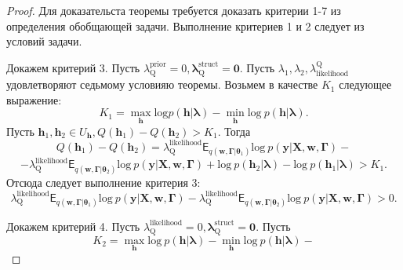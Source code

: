 \begin{proof}
Для доказательста теоремы требуется доказать критерии 1-7 из определения обобщающей задачи.
Выполнение критериев 1 и 2 следует из условий задачи.

Докажем критерий 3. 
Пусть $\lambda^{\text{prior}}_\text{Q} = 0, \boldsymbol{\lambda}^\text{struct}_\text{Q} = \mathbf{0}$. 
Пусть $\lambda_1, \lambda_2, \lambda_\text{likelihood}^\text{Q}$ удовлетворяют седьмому условияю теоремы.
Возьмем в качестве $K_1$ следующее выражение:
\[
    K_1= \max_{\mathbf{h}} \text{log} p (\mathbf{h}|\boldsymbol{\lambda})-\min_{\mathbf{h}} \text{log}~p(\mathbf{h}|\boldsymbol{\lambda}).
\]
Пусть $\mathbf{h}_1, \mathbf{h}_2 \in U_\mathbf{h}, Q(\mathbf{h}_1)-Q(\mathbf{h}_2)>K_1$.
Тогда 
\[
Q(\mathbf{h}_1)-Q(\mathbf{h}_2) = \lambda^\text{likelihood}_\text{Q} \mathsf{E}_{q(\mathbf{w}, \boldsymbol{\Gamma}|\boldsymbol{\theta}_1)} \text{log}~p(\mathbf{y}|\mathbf{X}, \mathbf{w}, \boldsymbol{\Gamma})-\]
\[
-\lambda^\text{likelihood}_\text{Q}  \mathsf{E}_{q(\mathbf{w}, \boldsymbol{\Gamma}|\boldsymbol{\theta}_2)} \text{log}~p(\mathbf{y}|\mathbf{X}, \mathbf{w}, \boldsymbol{\Gamma})
+\text{log}~p(\mathbf{h}_2|\boldsymbol{\lambda})-\text{log}~p(\mathbf{h}_1|\boldsymbol{\lambda})>K_1.
\]
Отсюда следует  выполнение критерия 3:
\[
\lambda^\text{likelihood}_\text{Q} \mathsf{E}_{q(\mathbf{w}, \boldsymbol{\Gamma}|\boldsymbol{\theta}_1)} \text{log}~p(\mathbf{y}|\mathbf{X}, \mathbf{w}, \boldsymbol{\Gamma}) - \lambda^\text{likelihood}_\text{Q} \mathsf{E}_{q(\mathbf{w}, \boldsymbol{\Gamma}|\boldsymbol{\theta}_2)} \text{log}~p(\mathbf{y}|\mathbf{X}, \mathbf{w}, \boldsymbol{\Gamma}) > 0.
\]

Докажем критерий 4. 
Пусть $\lambda^{\text{likelihood}}_\text{Q} = 0, \boldsymbol{\lambda}^\text{struct}_\text{Q} = \mathbf{0}$. 
Пусть 
\[
K_2 =  \max_{\mathbf{h}} \text{log}~p (\mathbf{h}|\boldsymbol{\lambda}) - \min_{\mathbf{h}} \text{log}~p (\mathbf{h}|\boldsymbol{\lambda}) -
\]


\end{proof}
